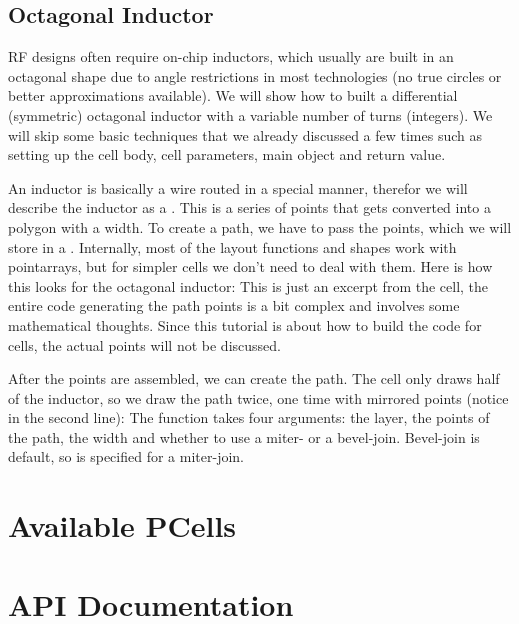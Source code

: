 \subsection{Octagonal Inductor}
RF designs often require on-chip inductors, which usually are built in an octagonal shape due to angle restrictions in most technologies (no true circles or better
approximations available). We will show how to built a differential (symmetric) octagonal inductor with a variable number of turns (integers). We will skip some
basic techniques that we already discussed a few times such as setting up the cell body, cell parameters, main object and return value.

An inductor is basically a wire routed in a special manner, therefor we will describe the inductor as a . This is a series of points that gets converted
into a polygon with a width. To create a path, we have to pass the points, which we will store in a . Internally, most of the layout functions
and shapes work with pointarrays, but for simpler cells we don't need to deal with them. Here is how this looks for the octagonal inductor:
This is just an excerpt from the cell, the entire code generating the path points is a bit complex and involves some mathematical thoughts. Since this tutorial is
about how to build the code for cells, the actual points will not be discussed.

After the points are assembled, we can create the path. The cell only draws half of the inductor, so we draw the path twice, one time with mirrored points (notice
 in the second line):
The  function takes four arguments: the layer, the points of the path, the width and whether to use a miter- or a bevel-join. Bevel-join is
default, so  is specified for a miter-join.

\section{Available PCells}
\section{API Documentation}
